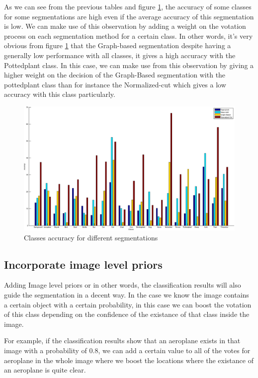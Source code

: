 \documentclass[twoside,11pt]{article}
\begin{document}
As we can see from the previous tables and figure \ref{fig:classesseg}, the
accuracy of some classes for some segmentations are high even if
the average accuracy of this segmentation is low. We can make use of this
observation by adding a weight on the votation process on each
segmentation method for a certain class. In other words, it's very obvious from
figure \ref{fig:classesseg} that the Graph-based segmentation
despite having a generally low performance with all classes, it gives a high
accuracy with the Pottedplant class. In this case, we can
make use from this observation by giving a higher weight on the decision of the
Graph-Based segmentation with the pottedplant class than
for instance the Normalized-cut which gives a low accuracy with this class
particularly.
\begin{figure}
\includegraphics[scale =.45]{./Figures/classesbest.eps}
\centering
\caption{Classes accuracy for different segmentations}
\label{fig:classesseg}
\end{figure}

\subsection{Incorporate image level priors}

Adding Image level priors or in other words, the classification results will
also guide the segmentation in a decent way. In the case we know
the image contains a certain object with a certain probability, in this case we
can boost the votation of this class depending on the confidence
of the existance of that class inside the image.

For example, if the classification results show that an aeroplane exists in that
image with a probability of 0.8, we can add a certain value
to all of the votes for aeroplane in the whole image where we boost the
locations where the existance of an aeroplane is quite clear.
\end{document}
